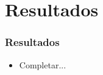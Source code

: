 \section[Resultados]{Resultados}

\begin{frame}
  \frametitle{Resultados}
  \begin{itemize}
    \item Completar...
  \end{itemize}
\end{frame}